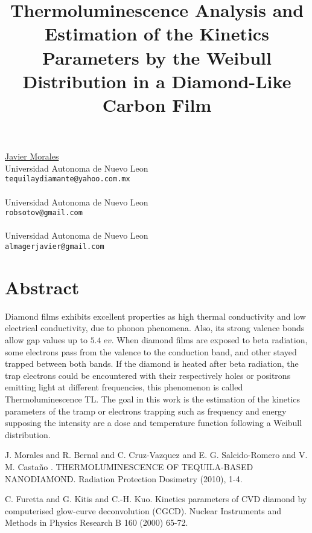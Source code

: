 \title{Thermoluminescence Analysis and Estimation of the Kinetics Parameters by the Weibull Distribution in a Diamond-Like Carbon Film}
\author{}  \institute{}
\maketitle
\begin{center}
{\large \underline{Javier Morales}}\\
Universidad Autonoma de Nuevo Leon\\
{\tt tequilaydiamante@yahoo.com.mx}
\\ \vspace{4mm}{\large Roberto Soto}\\
Universidad Autonoma de Nuevo Leon\\
{\tt robsotov@gmail.com}
\\ \vspace{4mm}{\large Javier Almaguer}\\
Universidad Autonoma de Nuevo Leon\\
{\tt almagerjavier@gmail.com}

\end{center}

\section*{Abstract}


Diamond films exhibits excellent properties as high thermal conductivity and low electrical conductivity, due to phonon phenomena.  Also, its strong valence bonds allow gap values up to $5.4 \;ev$. When diamond films are exposed to beta radiation, some electrons pass from the valence to the conduction band, and other stayed trapped between both bands. If the diamond is heated after beta radiation, the trap electrons could be encountered with their respectively holes or positrons emitting light at different frequencies, this phenomenon is called Thermoluminescence TL.   
 The goal in this work is the estimation of the kinetics parameters of the tramp or electrons trapping such as frequency and energy supposing the intensity are a dose and temperature function following a Weibull distribution.


\begin{thebibliography}{10}

{\sc J. Morales and R. Bernal and C. Cruz-Vazquez and E. G. Salcido-Romero and V. M. Casta\~no }. {THERMOLUMINESCENCE OF TEQUILA-BASED NANODIAMOND}. Radiation Protection Dosimetry (2010), 1-4.



{\sc C. Furetta and G. Kitis and C.-H. Kuo}. {Kinetics parameters of CVD diamond by computerised glow-curve deconvolution (CGCD)}. Nuclear Instruments and Methods in Physics Research B 160 (2000) 65-72.

\end{thebibliography}
